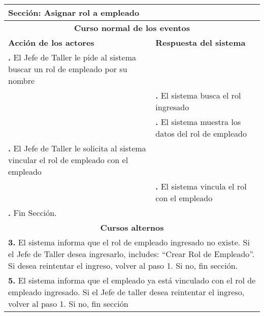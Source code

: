 \documentclass[12pt]{extarticle}
\newcounter{step}
\newcommand\inc{\stepcounter{step}\textbf{\thestep. }}
\newcommand\resetinc{\setcounter{step}{0}}
\begin{document}
    \resetinc

	\begin{longtable}{ |p{8cm}|p{8cm}| }
		\hline
		\multicolumn{2}{|p{16cm}|}{\textbf{Sección}: Asignar rol a empleado}\\
		\hline
		\multicolumn{2}{|c|}{\textbf{Curso normal de los eventos}}\\
		\hline
		\textbf{Acción de los actores} & \textbf{Respuesta del sistema}\\
		\hline
			\inc El Jefe de Taller le pide al sistema buscar un rol de empleado por su nombre& \\
			\hline
		    & \inc El sistema busca el rol ingresado \\
			\hline
		    & \inc El sistema muestra los datos del rol de empleado \\
			\hline
			\inc El Jefe de Taller le solicita al sistema vincular el rol de empleado con el empleado &\\
			\hline
		    & \inc El sistema vincula el rol con el empleado\\
			\hline
			\inc Fin Sección. & \\
		\hline
		\multicolumn{2}{|c|}{\textbf{Cursos alternos}}\\
		\hline
        \multicolumn{2}{|p{16cm}|}{\textbf{3. }El sistema informa que el rol de empleado ingresado no existe. Si el Jefe de Taller desea ingresarlo, includes: ``Crear Rol de Empleado''. Si desea reintentar el ingreso, volver al paso 1. Si no, fin sección.}\\
		\hline
        \multicolumn{2}{|p{16cm}|}{\textbf{5. }El sistema informa que el empleado ya está vinculado con el rol de empleado ingresado. Si el Jefe de taller desea reintentar el ingreso, volver al paso 1. Si no, fin sección}\\
		\hline
	\end{longtable}


    \resetinc
\end{document}
